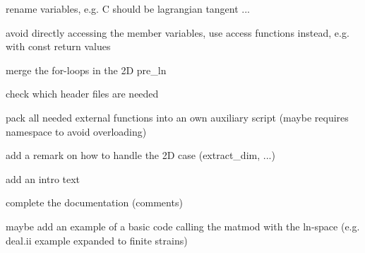 \begin{DoxyItemize}
\item rename variables, e.\+g. \textquotesingle{}C\textquotesingle{} should be lagrangian tangent ...
\item avoid directly accessing the member variables, use access functions instead, e.\+g. with const return values
\item merge the for-\/loops in the 2D pre\+\_\+ln
\item check which header files are needed
\item pack all needed external functions into an own auxiliary script (maybe requires namespace to avoid overloading)
\item add a remark on how to handle the 2D case (extract\+\_\+dim, ...)
\item add an intro text
\item complete the documentation (comments)
\item maybe add an example of a basic code calling the matmod with the ln-\/space (e.\+g. deal.\+ii example expanded to finite strains) 
\end{DoxyItemize}